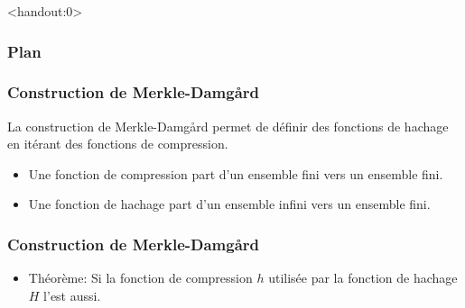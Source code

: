 \begin{frame}<handout:0>
  \frametitle{Plan}
  \tableofcontents[currentsection,subsectionstyle=hide]
\end{frame}

\begin{frame}[fragile]
  \frametitle{Construction de Merkle-Damg\r{a}rd}
  
  La construction de Merkle-Damg\r{a}rd permet de définir des fonctions de hachage en itérant des fonctions de compression.
  \begin{itemize}
  \item{Une fonction de compression part d'un ensemble fini vers un ensemble fini.}
  \item{Une fonction de hachage part d'un ensemble infini vers un ensemble fini.}
  \end{itemize}
\end{frame}

\begin{frame}[fragile]
  \frametitle{Construction de Merkle-Damg\r{a}rd}
  \begin{itemize}
\item{Théorème: Si la fonction de compression $h$ utilisée par la fonction de hachage $H$ l'est aussi.} 
  \end{itemize}
\end{frame}

